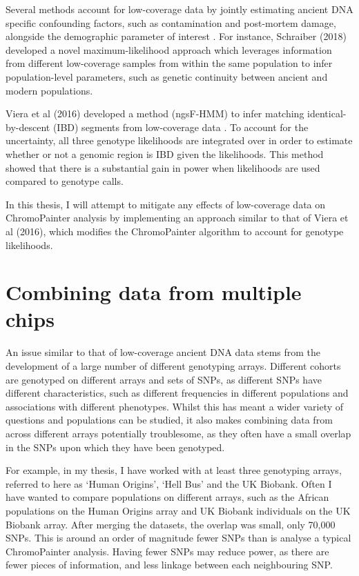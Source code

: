 Several methods account for low-coverage data by jointly estimating ancient DNA specific confounding factors, such as contamination and  post-mortem damage, alongside the demographic parameter of interest \cite{Racimo2016}. For instance, Schraiber (2018) \cite{Schraiber2018} developed a novel maximum-likelihood approach which leverages information from different low-coverage samples from within the same population to infer population-level parameters, such as genetic continuity between ancient and modern populations.  
 
Viera et al (2016) developed a method (ngsF-HMM) to infer matching identical-by-descent (IBD) segments from low-coverage data \cite{Vieira2016}. To account for the uncertainty, all three genotype likelihoods are integrated over in order to estimate whether or not a genomic region is IBD given the likelihoods. This method showed that there is a substantial gain in power when likelihoods are used compared to genotype calls.  

In this thesis, I will attempt to mitigate any effects of low-coverage data on ChromoPainter analysis by implementing an approach similar to that of Viera et al (2016), which modifies the ChromoPainter algorithm to account for genotype likelihoods.


\section{Combining data from multiple chips}

An issue similar to that of low-coverage ancient DNA data stems from the development of a large number of different genotyping arrays. Different cohorts are genotyped on different arrays and sets of SNPs, as different SNPs have different characteristics, such as different frequencies in different populations and associations with different phenotypes. Whilst this has meant a wider variety of questions and populations can be studied, it also makes combining data from across different arrays potentially troublesome, as they often have a small overlap in the SNPs upon which they have been genotyped.

For example, in my thesis, I have worked with at least three genotyping arrays, referred to here as `Human Origins', `Hell Bus' and the UK Biobank. Often I have wanted to compare populations on different arrays, such as the African populations on the Human Origins array and UK Biobank individuals on the UK Biobank array. After merging the datasets, the overlap was small, only 70,000 SNPs. This is around an order of magnitude fewer SNPs than is analyse a typical ChromoPainter analysis. Having fewer SNPs may reduce power, as there are fewer pieces of information, and less linkage between each neighbouring SNP.

